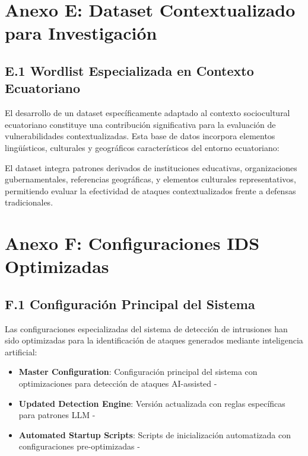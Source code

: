 \section*{Anexo E: Dataset Contextualizado para Investigación}

\subsection*{E.1 Wordlist Especializada en Contexto Ecuatoriano}
El desarrollo de un dataset específicamente adaptado al contexto sociocultural ecuatoriano constituye una contribución significativa para la evaluación de vulnerabilidades contextualizadas. Esta base de datos incorpora elementos lingüísticos, culturales y geográficos característicos del entorno ecuatoriano: 

El dataset integra patrones derivados de instituciones educativas, organizaciones gubernamentales, referencias geográficas, y elementos culturales representativos, permitiendo evaluar la efectividad de ataques contextualizados frente a defensas tradicionales.

\section*{Anexo F: Configuraciones IDS Optimizadas}

\subsection*{F.1 Configuración Principal del Sistema}
Las configuraciones especializadas del sistema de detección de intrusiones han sido optimizadas para la identificación de ataques generados mediante inteligencia artificial:
\begin{itemize}
    \item \textbf{Master Configuration}: Configuración principal del sistema con optimizaciones para detección de ataques AI-assisted - 
    \item \textbf{Updated Detection Engine}: Versión actualizada con reglas específicas para patrones LLM - 
    \item \textbf{Automated Startup Scripts}: Scripts de inicialización automatizada con configuraciones pre-optimizadas - 
\end{itemize}

